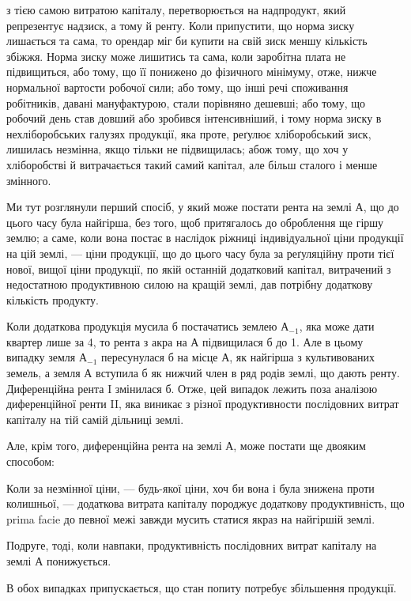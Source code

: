 \parcont{}  %
з тією самою витратою капіталу, перетворюється на надпродукт, який репрезентує
надзиск, а тому й ренту. Коли припустити, що норма зиску лишається
та сама, то орендар міг би купити на свій зиск меншу кількість збіжжя.
Норма зиску може лишитись та сама, коли заробітна плата не підвищиться,
або тому, що її понижено до фізичного мінімуму, отже, нижче нормальної вартости
робочої сили; або тому, що інші речі споживання робітників, давані мануфактурою,
стали порівняно дешевші; або тому, що робочий день став довший
або зробився інтенсивніший, і тому норма зиску в нехліборобських галузях
продукції, яка проте, реґулює хліборобський зиск, лишилась незмінна, якщо
тільки не підвищилась; абож тому, що хоч у хліборобстві й витрачається такий
самий капітал, але більш сталого і менше змінного.

Ми тут розглянули перший спосіб, у який може постати рента на землі
$А$, що до цього часу була найгірша, без того, щоб притягалось до оброблення
ще гіршу землю; а саме, коли вона постає в наслідок ріжниці індивідуальної
ціни продукції на цій землі, — ціни продукції, що до цього часу була за
реґуляційну проти тієї нової, вищої ціни продукції, по якій останній додатковий
капітал, витрачений з недостатною продуктивною силою на кращій землі,
дав потрібну додаткову кількість продукту.

Коли додаткова продукція мусила б постачатись землею $А_{-1}$, яка може дати
квартер лише за 4, то рента з акра на $А$ підвищилася б до 1. Але в цьому випадку
земля $А_{-1}$ пересунулася б на місце $А$, як
найгірша з культивованих земель, а земля $А$ вступила б як нижчий член в
ряд родів землі, що дають ренту. Диференційна рента I змінилася б. Отже,
цей випадок лежить поза аналізою диференційної ренти II, яка виникає з різної
продуктивности послідовних витрат капіталу на тій самій дільниці землі.

Але, крім того, диференційна рента на землі $А$, може постати ще двояким
способом:

Коли за незмінної ціни, — будь-якої ціни, хоч би вона і була знижена
проти колишньої, — додаткова витрата капіталу породжує додаткову продуктивність,
що prima facie до певної межі завжди мусить статися якраз на найгіршій
землі.

Подруге, тоді, коли навпаки, продуктивність послідовних витрат капіталу
на землі $А$ понижується.

В обох випадках припускається, що стан попиту потребує збільшення
продукції.

